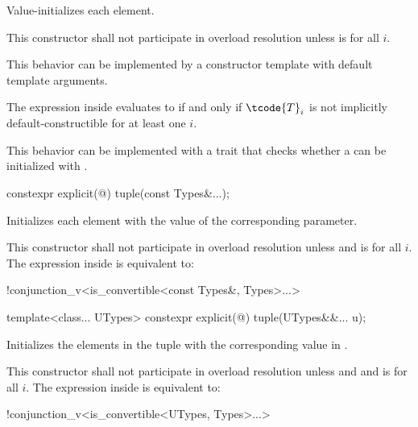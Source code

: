 \begin{itemdescr}
\pnum
\effects Value-initializes each element.

\pnum
\remarks
This constructor shall not participate in overload resolution unless
 is  for all $i$.
\begin{note} This behavior can be implemented by a constructor template
with default template arguments. \end{note}
The expression inside  evaluates to 
if and only if $\tcode{T}_i$ is not implicitly
default-constructible for at least one $i$.
\begin{note} This behavior can be implemented with a trait that checks whether
a  can be initialized with \tcode{\{\}}. \end{note}
\end{itemdescr}

%
\begin{itemdecl}
constexpr explicit(@\seebelow@) tuple(const Types&...);
\end{itemdecl}

\begin{itemdescr}
\pnum
\effects Initializes each element with the value of the
corresponding parameter.

\pnum
\remarks This constructor shall not participate in overload resolution unless
 and 
is  for all $i$.
The expression inside  is equivalent to:
\begin{codeblock}
!conjunction_v<is_convertible<const Types&, Types>...>
\end{codeblock}
\end{itemdescr}

%
\begin{itemdecl}
template<class... UTypes> constexpr explicit(@\seebelow@) tuple(UTypes&&... u);
\end{itemdecl}

\begin{itemdescr}
\pnum
\effects Initializes the elements in the tuple with the
corresponding value in .

\pnum
\remarks This constructor shall not participate in overload resolution unless
 \tcode{==}  and
 and 
is  for all $i$.
The expression inside  is equivalent to:
\begin{codeblock}
!conjunction_v<is_convertible<UTypes, Types>...>
\end{codeblock}
\end{itemdescr}

